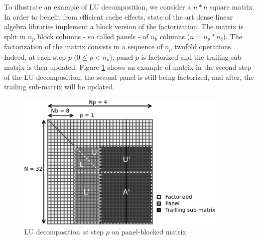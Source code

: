 To illustrate an example of LU decomposition, we consider a $n*n$ square matrix. In order to benefit from efficient cache effects, state of the art dense linear algebra libraries implement a block version of the factorization. The matrix is split in $n_p$ block columns - so called panels - of $n_b$ columns ($n = n_p * n_b$). The factorization of the matrix consists in a sequence of $n_p$ twofold operations. Indeed, at each step $p$ ($0 \leq p < n_p$), panel $p$ is factorized and the trailing sub-matrix is then updated. Figure \ref{fig:matrix} shows an example of matrix in the second step of the LU decomposition, the second panel is still being factorized, and after, the trailing sub-matrix will be updated.

\begin{figure}[!ht]
\centering
\includegraphics[width=0.9\textwidth]{figures/panel_matrix_bw.pdf}
\caption{LU decomposition at step $p$ on panel-blocked matrix \label{fig:matrix}}
\end{figure}

